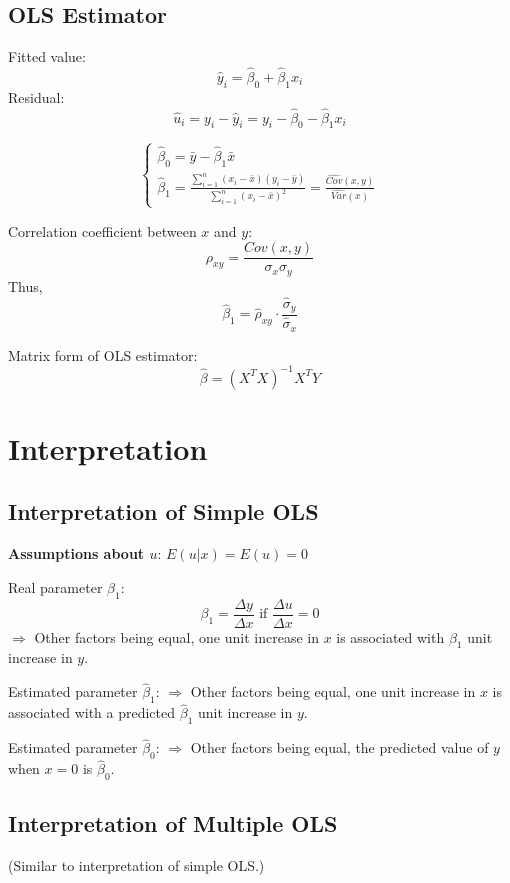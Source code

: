 \documentclass[11pt,a4paper]{article}
\begin{document}
\subsection{OLS Estimator}
Fitted value:
\[
\hat{y}_i = \hat{\beta}_0 + \hat{\beta}_1 x_{i}
\]
Residual:
\[
\hat{u}_i = y_i - \hat{y}_i = y_i - \hat{\beta}_0 - \hat{\beta}_1 x_{i}
\]

\[
\begin{cases}
    \hat{\beta}_0 = \bar{y} - \hat{\beta}_1 \bar{x} \\
    \hat{\beta}_1 = \frac{\sum_{i=1}^n (x_i - \bar{x})(y_i - \bar{y})}{\sum_{i=1}^n (x_i - \bar{x})^2} = \frac{\widehat{Cov}(x,y)}{\widehat{Var}(x)}
\end{cases}
\]

Correlation coefficient between $x$ and $y$:
\[
\rho_{xy} = \frac{Cov(x,y)}{\sigma_x \sigma_y}
\]
Thus, 
\[
\hat{\beta}_1 = \hat{\rho}_{xy} \cdot \frac{\hat{\sigma}_y}{\hat{\sigma}_x}
\]

Matrix form of OLS estimator:
\[
\hat{\beta} = (X^T X)^{-1} X^T Y
\]

\section{Interpretation}
\subsection{Interpretation of Simple OLS}
\textbf{Assumptions about $u$}: $E(u|x) = E(u) = 0$

Real parameter $\beta_1$:
\[
\beta_1 = \frac{\Delta y}{\Delta x} \text{ if } \frac{\Delta u}{\Delta x} = 0
\]
$\Rightarrow$ Other factors being equal, one unit increase in $x$ is associated with $\beta_1$ unit increase in $y$. \par

Estimated parameter $\hat{\beta}_1$:
$\Rightarrow$ Other factors being equal, one unit increase in $x$ is associated with a predicted $\hat{\beta}_1$ unit increase in $y$. \par

Estimated parameter $\hat{\beta}_0$:
$\Rightarrow$ Other factors being equal, the predicted value of $y$ when $x=0$ is $\hat{\beta}_0$. \par

\subsection{Interpretation of Multiple OLS}
(Similar to interpretation of simple OLS.)
\end{document}
